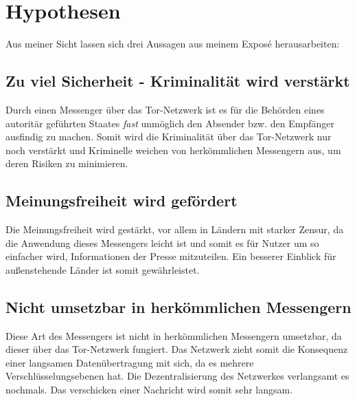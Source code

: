 \documentclass[a4paper,10pt,ngerman,
  headheight=28pt,]{scrartcl}
\begin{document}
\section{Hypothesen}
Aus meiner Sicht lassen sich drei Aussagen aus meinem Exposé herausarbeiten:
\subsection{Zu viel Sicherheit - Kriminalität wird verstärkt}
Durch einen Messenger über das Tor-Netzwerk ist es für die Behörden eines autoritär geführten Staates \textit{fast} unmöglich den Absender bzw. den Empfänger ausfindig zu machen. Somit wird die Kriminalität über das Tor-Netzwerk nur noch verstärkt und Kriminelle weichen von herkömmlichen Messengern aus, um deren Risiken zu minimieren.

\subsection{Meinungsfreiheit wird gefördert}
Die Meinungsfreiheit wird gestärkt, vor allem in Ländern mit starker Zensur, da die Anwendung dieses Messengers leicht ist und somit es für Nutzer um so einfacher wird, Informationen der Presse mitzuteilen. Ein besserer Einblick für außenstehende Länder ist somit gewährleistet.

\subsection{Nicht umsetzbar in herkömmlichen Messengern}
Diese Art des Messengers ist nicht in herkömmlichen Messengern umsetzbar, da dieser über das Tor-Netzwerk fungiert. Das Netzwerk zieht somit die Konsequenz einer langsamen Datenübertragung mit sich, da es mehrere Verschlüsselungsebenen hat. Die Dezentralisierung des Netzwerkes verlangsamt es nochmals. Das verschicken einer Nachricht wird somit sehr langsam.

\printbibliography %
\end{document}
